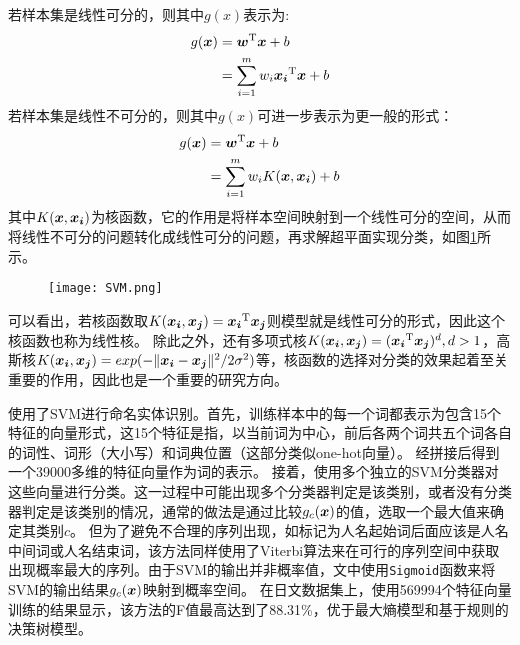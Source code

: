 若样本集是线性可分的，则其中$g(x)$表示为:
\begin{align}
    g(\boldsymbol{x}) &= \boldsymbol{w}^{\mathrm{T}}\boldsymbol{x} + b\\
    &= \sum_{i = 1}^m w_i\boldsymbol{x_i}^{\mathrm{T}}\boldsymbol{x} + b
\end{align}
若样本集是线性不可分的，则其中$g(x)$可进一步表示为更一般的形式：
\begin{align}
    g(\boldsymbol{x}) &= \boldsymbol{w}^{\mathrm{T}}\boldsymbol{x} + b\\
    &= \sum_{i = 1}^m w_i K(\boldsymbol{x}, \boldsymbol{x_i}) + b
\end{align}
其中$K(\boldsymbol{x}, \boldsymbol{x_i})$为核函数，它的作用是将样本空间映射到一个线性可分的空间，从而将线性不可分的问题转化成线性可分的问题，再求解超平面实现分类，如图\ref{fig:SVM}\citep{alisneakysvm}所示。

\begin{figure}[H]
    \centering
    \texttt{[image: SVM.png]}
    \label{fig:SVM}
\end{figure}

可以看出，若核函数取$K(\boldsymbol{x_i}, \boldsymbol{x_j}) = \boldsymbol{x_i}^{\mathrm{T}}\boldsymbol{x_j}$则模型就是线性可分的形式，因此这个核函数也称为线性核。
除此之外，还有多项式核$K(\boldsymbol{x_i}, \boldsymbol{x_j}) = (\boldsymbol{x_i}^{\mathrm{T}}\boldsymbol{x_j})^d, d>1$，高斯核$K(\boldsymbol{x_i}, \boldsymbol{x_j}) = exp(-{\lVert\boldsymbol{x_i} - \boldsymbol{x_j}\rVert^2}/{2\sigma^2})$等，核函数的选择对分类的效果起着至关重要的作用，因此也是一个重要的研究方向。

\citet{isozaki2002efficient}使用了SVM进行命名实体识别。首先，训练样本中的每一个词都表示为包含15个特征的向量形式，这15个特征是指，以当前词为中心，前后各两个词共五个词各自的词性、词形（大小写）和词典位置（这部分类似one-hot向量）。
经拼接后得到一个39000多维的特征向量作为词的表示。
接着，使用多个独立的SVM分类器对这些向量进行分类。这一过程中可能出现多个分类器判定是该类别，或者没有分类器判定是该类别的情况，通常的做法是通过比较$g_c (\boldsymbol{x})$的值，选取一个最大值来确定其类别$c$。
但为了避免不合理的序列出现，如标记为人名起始词后面应该是人名中间词或人名结束词，该方法同样使用了Viterbi算法来在可行的序列空间中获取出现概率最大的序列。由于SVM的输出并非概率值，文中使用\verb|Sigmoid|函数来将SVM的输出结果$g_c (\boldsymbol{x})$映射到概率空间。
在日文数据集上，使用569994个特征向量训练的结果显示，该方法的F值最高达到了88.31\%，优于最大熵模型和基于规则的决策树模型。

